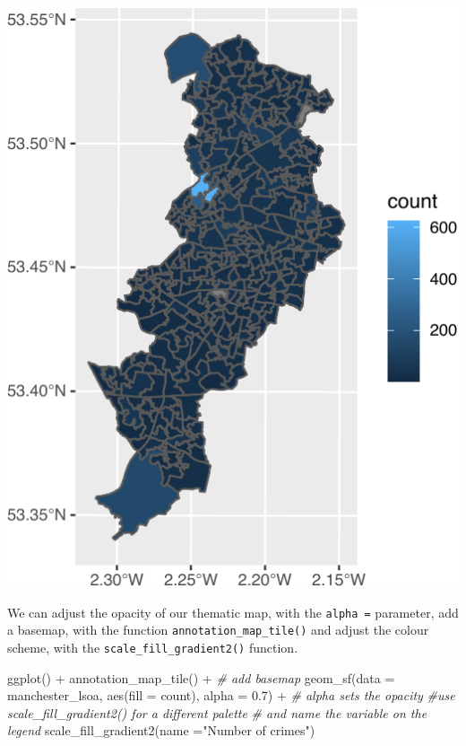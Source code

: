 \documentclass[
]{book}
\newenvironment{Shaded}{\begin{snugshade}}{\end{snugshade}}
\newcommand{\AttributeTok}[1]{\textcolor[rgb]{0.77,0.63,0.00}{#1}}
\newcommand{\CommentTok}[1]{\textcolor[rgb]{0.56,0.35,0.01}{\textit{#1}}}
\newcommand{\FloatTok}[1]{\textcolor[rgb]{0.00,0.00,0.81}{#1}}
\newcommand{\FunctionTok}[1]{\textcolor[rgb]{0.00,0.00,0.00}{#1}}
\newcommand{\NormalTok}[1]{#1}
\newcommand{\SpecialCharTok}[1]{\textcolor[rgb]{0.00,0.00,0.00}{#1}}
\newcommand{\StringTok}[1]{\textcolor[rgb]{0.31,0.60,0.02}{#1}}
\begin{document}
\includegraphics{crime_mapping_files/figure-latex/unnamed-chunk-30-1.pdf}

We can adjust the opacity of our thematic map, with the \texttt{alpha\ =} parameter, add a basemap, with the function \texttt{annotation\_map\_tile()} and adjust the colour scheme, with the \texttt{scale\_fill\_gradient2()} function.

\begin{Shaded}
\begin{Highlighting}[]
\FunctionTok{ggplot}\NormalTok{() }\SpecialCharTok{+} 
  \FunctionTok{annotation\_map\_tile}\NormalTok{() }\SpecialCharTok{+}  \CommentTok{\# add basemap}
\FunctionTok{geom\_sf}\NormalTok{(}\AttributeTok{data =}\NormalTok{ manchester\_lsoa, }
        \FunctionTok{aes}\NormalTok{(}\AttributeTok{fill =}\NormalTok{ count), }
        \AttributeTok{alpha =} \FloatTok{0.7}\NormalTok{) }\SpecialCharTok{+} \CommentTok{\# alpha sets the opacity}
  \CommentTok{\#use scale\_fill\_gradient2() for a different palette }
  \CommentTok{\# and name the variable on the legend}
  \FunctionTok{scale\_fill\_gradient2}\NormalTok{(}\AttributeTok{name =}\StringTok{"Number of crimes"}\NormalTok{) }
\end{Highlighting}
\end{Shaded}
\end{document}
